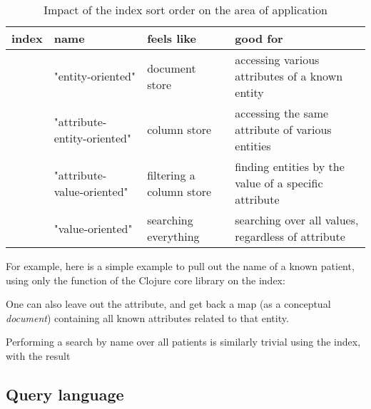 
\begin{table}[]
  \label{tbl:indices}
  \caption{Impact of the index sort order on the area of application}
  \begin{tabularx}{\textwidth}{|l|s|s|X|}
  \hline
  \textbf{index} & \textbf{name}               & \textbf{feels like}      & \textbf{good for}                                     \\ \hline
            & "entity-oriented"           & document store           & accessing various attributes of a known entity        \\ \hline
            & "attribute-entity-oriented" & column store             & accessing the same attribute of various entities      \\ \hline
            & "attribute-value-oriented"  & filtering a column store & finding entities by the value of a specific attribute \\ \hline
            & "value-oriented"            & searching everything     & searching over all values, regardless of attribute    \\ \hline
  \end{tabularx}
\end{table}

For example, here is a simple example to pull out the name of a known patient, using only the  function of the Clojure core library on the  index:

\begin{center}
\end{center}

One can also leave out the attribute, and get back a map (as a conceptual \emph{document}) containing all known attributes related to that entity.

\begin{center}
\end{center}

Performing a search by name over all patients is similarly trivial using the  index, with the result

\begin{center}
\end{center}



\subsection{Query language}

